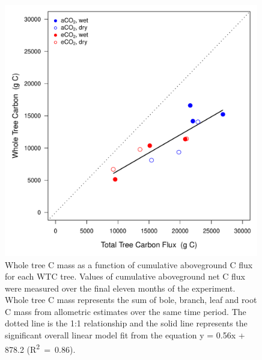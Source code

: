 \documentclass[a4paper]{article}\usepackage[]{graphicx}\usepackage[]{color}
\begin{document}
\begin{figure}[h!]
    \centering
    \includegraphics[width=0.99\textwidth]{flux_treecarbon3.pdf}
    \caption{Whole tree C mass as a function of cumulative aboveground C flux for each WTC tree. Values of cumulative aboveground net C flux were measured over the final eleven months of the experiment. Whole tree C mass represents the sum of bole, branch, leaf and root C mass from allometric estimates over the same time period. The dotted line is the 1:1 relationship and the solid line represents the significant overall linear model fit from the equation y = 0.56x + 878.2 (R\textsuperscript{2}~=~0.86).}
    \label{fig:figure 4.2}
\end{figure}
\end{document}
